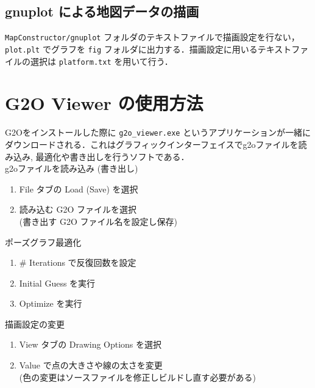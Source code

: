 \documentclass[dvipdfmx]{jsarticle}
\begin{document}
\cprotect \subsection{gnuplot による地図データの描画}
\verb|MapConstructor/gnuplot| フォルダのテキストファイルで描画設定を行ない， \verb|plot.plt| でグラフを \verb|fig| フォルダに出力する．描画設定に用いるテキストファイルの選択は \verb|platform.txt| を用いて行う．

\clearpage
\section{G2O Viewer の使用方法}
G2Oをインストールした際に \verb|g2o_viewer.exe| というアプリケーションが一緒にダウンロードされる．これはグラフィックインターフェイスでg2oファイルを読み込み, 最適化や書き出しを行うソフトである．\\

g2oファイルを読み込み (書き出し) \vspace{-1zh}
\begin{enumerate}
	\item File タブの Load (Save) を選択
	\item 読み込む G2O ファイルを選択 \\
		 (書き出す G2O ファイル名を設定し保存) 
\end{enumerate}

ポーズグラフ最適化 \vspace{-1zh}
\begin{enumerate}
	\item \# Iterations で反復回数を設定
	\item Initial Guess を実行
	\item Optimize を実行
\end{enumerate}

描画設定の変更 \vspace{-1zh}
\begin{enumerate}
	\item View タブの Drawing Options を選択
	\item Value で点の大きさや線の太さを変更 \\
		 (色の変更はソースファイルを修正しビルドし直す必要がある) 
\end{enumerate}
\end{document}
